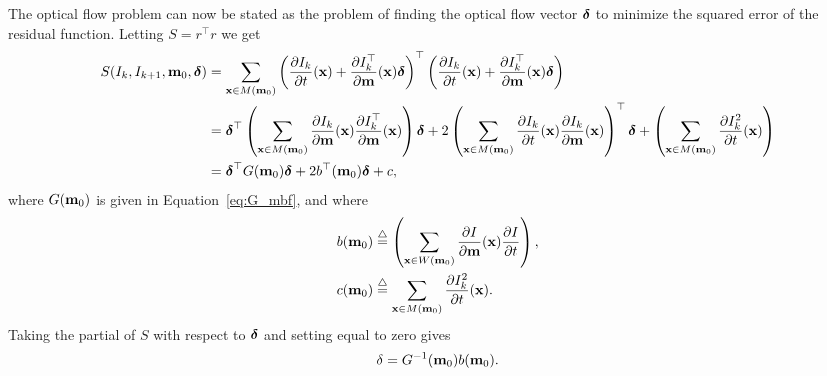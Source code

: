 The optical flow problem can now be stated as the problem of finding the optical flow vector $\boldsymbol{\delta}$ to minimize the squared error of the residual function.  
Letting $S = r^\top r$ we get 
\begin{align*}
S(I_k, I_{k+1}, \mathbf{m}_0, \boldsymbol{\delta}) &= \sum_{\mathbf{x}\in M(\mathbf{m}_0)} \left(\frac{\partial I_k}{\partial t}(\mathbf{x}) + \frac{\partial I_k^\top}{\partial \mathbf{m}}(\mathbf{x})\boldsymbol{\delta}\right)^\top \left(\frac{\partial I_k}{\partial t}(\mathbf{x}) + \frac{\partial I_k^\top}{\partial \mathbf{m}}(\mathbf{x})\boldsymbol{\delta}\right) \\
&= \boldsymbol{\delta}^\top \left(\sum_{\mathbf{x}\in M(\mathbf{m}_0)}\frac{\partial I_k}{\partial \mathbf{m}}(\mathbf{x})\frac{\partial I_k^\top}{\partial \mathbf{m}}(\mathbf{x})\right) \boldsymbol{\delta}
	+ 2\left(\sum_{\mathbf{x}\in M(\mathbf{m}_0)}\frac{\partial I_k}{\partial t}(\mathbf{x})\frac{\partial I_k}{\partial \mathbf{m}}(\mathbf{x})\right)^\top \boldsymbol{\delta} 
	+ \left(\sum_{\mathbf{x}\in M(\mathbf{m}_0)}\frac{\partial I_k^2}{\partial t}(\mathbf{x}) \right) \\
&= 	\boldsymbol{\delta}^\top G(\mathbf{m}_0) \boldsymbol{\delta} + 2b^\top(\mathbf{m}_0) \boldsymbol{\delta} + c,
\end{align*}
where $G(\mathbf{m}_0)$ is given in Equation~\eqref{eq:G_mbf}, and where 
\begin{align*}
b(\mathbf{m}_0) &\stackrel{\triangle}{=} \left(\sum_{\mathbf{x}\in W(\mathbf{m}_0)} \frac{\partial I}{\partial\mathbf{m}}(\mathbf{x}) \frac{\partial I}{\partial t}\right), \\
c(\mathbf{m}_0) &\stackrel{\triangle}{=} \sum_{\mathbf{x}\in M(\mathbf{m}_0)}\frac{\partial I_k^2}{\partial t}(\mathbf{x}).
\end{align*}
Taking the partial of $S$ with respect to $\boldsymbol{\delta}$ and setting equal to zero gives
\begin{equation}\label{eq:optical_flow_4}
\delta = G^{-1}(\mbf_0) b(\mbf_0).
\end{equation} 
%
%
%
%
